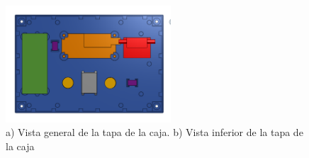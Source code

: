 \begin{figure}[h]%
    \centering 
        \includegraphics[width=0.55\textwidth]{04-caja/ensamblajetapainferior.png}
    \caption{a) Vista general de la tapa de la caja. b) Vista inferior de la tapa de la caja}
    \label{fig:cajatapaensamblaje} 
\end{figure} 
